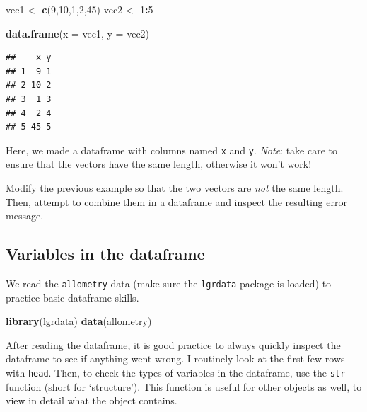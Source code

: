 \documentclass[]{book}
\newenvironment{Shaded}{\begin{snugshade}}{\end{snugshade}}
\newcommand{\DataTypeTok}[1]{\textcolor[rgb]{0.13,0.29,0.53}{#1}}
\newcommand{\DecValTok}[1]{\textcolor[rgb]{0.00,0.00,0.81}{#1}}
\newcommand{\KeywordTok}[1]{\textcolor[rgb]{0.13,0.29,0.53}{\textbf{#1}}}
\newcommand{\NormalTok}[1]{#1}
\newcommand{\OperatorTok}[1]{\textcolor[rgb]{0.81,0.36,0.00}{\textbf{#1}}}
\newcommand{\StringTok}[1]{\textcolor[rgb]{0.31,0.60,0.02}{#1}}
\let\BeginKnitrBlock\begin \let\EndKnitrBlock\end
\begin{document}
\begin{Shaded}
\begin{Highlighting}[]
\NormalTok{vec1 <-}\StringTok{ }\KeywordTok{c}\NormalTok{(}\DecValTok{9}\NormalTok{,}\DecValTok{10}\NormalTok{,}\DecValTok{1}\NormalTok{,}\DecValTok{2}\NormalTok{,}\DecValTok{45}\NormalTok{)}
\NormalTok{vec2 <-}\StringTok{ }\DecValTok{1}\OperatorTok{:}\DecValTok{5}

\KeywordTok{data.frame}\NormalTok{(}\DataTypeTok{x =}\NormalTok{ vec1, }\DataTypeTok{y =}\NormalTok{ vec2)}
\end{Highlighting}
\end{Shaded}

\begin{verbatim}
##    x y
## 1  9 1
## 2 10 2
## 3  1 3
## 4  2 4
## 5 45 5
\end{verbatim}

Here, we made a dataframe with columns named \texttt{x} and \texttt{y}. \emph{Note}: take care to ensure that the vectors have the same length, otherwise it won't work!

\BeginKnitrBlock{rmdtry}
Modify the previous example so that the two vectors are \emph{not} the same length. Then, attempt to combine them in a dataframe and inspect the resulting error message.
\EndKnitrBlock{rmdtry}

\hypertarget{vecdataframes}{%
\subsection{Variables in the dataframe}\label{vecdataframes}}

We read the \texttt{allometry} data (make sure the \texttt{lgrdata} package is loaded) to practice basic dataframe skills.

\begin{Shaded}
\begin{Highlighting}[]
\KeywordTok{library}\NormalTok{(lgrdata)}
\KeywordTok{data}\NormalTok{(allometry)}
\end{Highlighting}
\end{Shaded}

After reading the dataframe, it is good practice to always quickly inspect the dataframe to see if anything went wrong. I routinely look at the first few rows with \texttt{head}. Then, to check the types of variables in the dataframe, use the \texttt{str} function (short for `structure'). This function is useful for other objects as well, to view in detail what the object contains.
\end{document}
